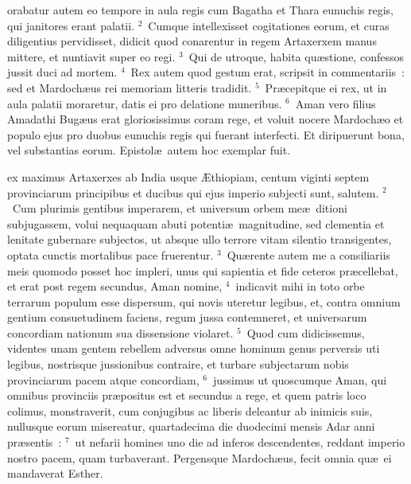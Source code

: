 \bchapter
{}orabatur autem eo tempore in aula regis cum Bagatha et Thara eunuchis regis, qui janitores erant palatii.
${}^{2}$~Cumque intellexisset cogitationes eorum, et curas diligentius pervidisset, didicit quod conarentur in regem Artaxerxem manus mittere, et nuntiavit super eo regi.
${}^{3}$~Qui de utroque, habita qu\ae stione, confessos jussit duci ad mortem.
${}^{4}$~Rex autem quod gestum erat, scripsit in commentariis~: sed et Mardoch\ae us rei memoriam litteris tradidit.
${}^{5}$~Pr\ae cepitque ei rex, ut in aula palatii moraretur, datis ei pro delatione muneribus.
${}^{6}$~Aman vero filius Amadathi Bug\ae us erat gloriosissimus coram rege, et voluit nocere Mardoch\ae o et populo ejus pro duobus eunuchis regis qui fuerant interfecti. Et diripuerunt bona, vel substantias eorum. Epistol\ae\ autem hoc exemplar fuit.

\bchapter
{}ex maximus Artaxerxes ab India usque \AE thiopiam, centum viginti septem provinciarum principibus et ducibus qui ejus imperio subjecti sunt, salutem.
${}^{2}$~Cum plurimis gentibus imperarem, et universum orbem me\ae\ ditioni subjugassem, volui nequaquam abuti potenti\ae\ magnitudine, sed clementia et lenitate gubernare subjectos, ut absque ullo terrore vitam silentio transigentes, optata cunctis mortalibus pace fruerentur.
${}^{3}$~Qu\ae rente autem me a consiliariis meis quomodo posset hoc impleri, unus qui sapientia et fide ceteros pr\ae cellebat, et erat post regem secundus, Aman nomine,
${}^{4}$~indicavit mihi in toto orbe terrarum populum esse dispersum, qui novis uteretur legibus, et, contra omnium gentium consuetudinem faciens, regum jussa contemneret, et universarum concordiam nationum sua dissensione violaret.
${}^{5}$~Quod cum didicissemus, videntes unam gentem rebellem adversus omne hominum genus perversis uti legibus, nostrisque jussionibus contraire, et turbare subjectarum nobis provinciarum pacem atque concordiam,
${}^{6}$~jussimus ut quoscumque Aman, qui omnibus provinciis pr\ae positus est et secundus a rege, et quem patris loco colimus, monstraverit, cum conjugibus ac liberis deleantur ab inimicis suis, nullusque eorum misereatur, quartadecima die duodecimi mensis Adar anni pr\ae sentis~:
${}^{7}$~ut nefarii homines uno die ad inferos descendentes, reddant imperio nostro pacem, quam turbaverant. Pergensque Mardoch\ae us, fecit omnia qu\ae\ ei mandaverat Esther.


